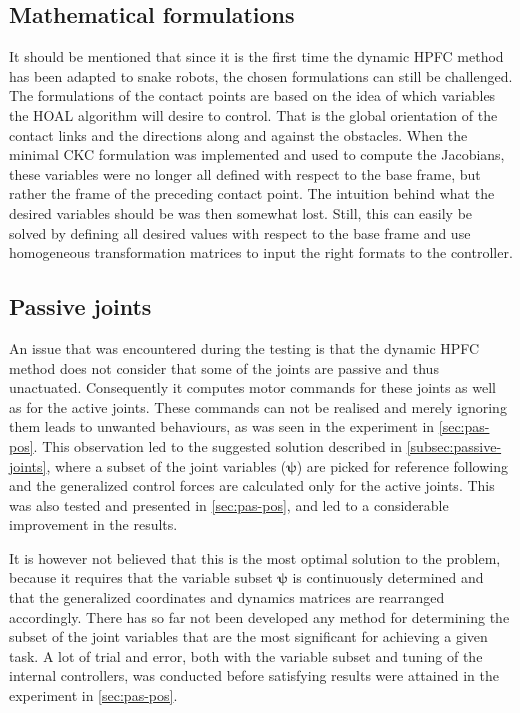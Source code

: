 \subsection{Mathematical formulations}

It should be mentioned that since it is the first time the dynamic HPFC method has been adapted to snake robots, the chosen formulations can still be challenged. The formulations of the contact points are based on the idea of which variables the HOAL algorithm will desire to control. That is the global orientation of the contact links and the directions along and against the obstacles. When the minimal CKC formulation was implemented and used to compute the Jacobians, these variables were no longer all defined with respect to the base frame, but rather the frame of the preceding contact point. The intuition behind what the desired variables should be was then somewhat lost. Still, this can easily be solved by defining all desired values with respect to the base frame and use homogeneous transformation matrices to input the right formats to the controller.

\subsection{Passive joints}\label{subsec:dis-passive-joints}

An issue that was encountered during the testing is that the dynamic HPFC method does not consider that some of the joints are passive and thus unactuated. Consequently it computes motor commands for these joints as well as for the active joints. These commands can not be realised and merely ignoring them leads to unwanted behaviours, as was seen in the experiment in \ref{sec:pas-pos}. This observation led to the suggested solution described in \ref{subsec:passive-joints}, where a subset of the joint variables ($\boldsymbol{\psi}$) are picked for reference following and the generalized control forces are calculated only for the active joints. This was also tested and presented in \ref{sec:pas-pos}, and led to a considerable improvement in the results.

It is however not believed that this is the most optimal solution to the problem, because it requires that the variable subset $\boldsymbol{\psi}$ is continuously determined and that the generalized coordinates and dynamics matrices are rearranged accordingly. There has so far not been developed any method for determining the subset of the joint variables that are the most significant for achieving a given task. A lot of trial and error, both with the variable subset and tuning of the internal controllers, was conducted before satisfying results were attained in the experiment in \ref{sec:pas-pos}.


